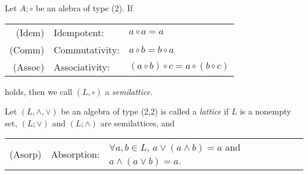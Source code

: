 \begin{definition}
    Let \(A;\circ\) be an alebra of type (2). If
    \begin{center}
        \begin{tabular}{r l l}
            (Idem) & Idempotent: & \(a \circ a = a\) \\
            (Comm) & Commutativity: & \(a \circ b = b \circ a\) \\
            (Assoc) & Associativity: & \((a\circ b) \circ c = a \circ (b \circ c)\)
        \end{tabular}
    \end{center}
    holds, then we call \((L,\circ)\) a \emph{semilattice}.
\end{definition}

\begin{definition}
    Let \((L,\wedge,\vee)\) be an algebra of type (2,2) is called a \emph{lattice} if \(L\) is a nonempty set, \((L;\vee)\) and \((L;\wedge)\) are semilattices, and
    \begin{center}
    \begin{tabular}{r l l}
        (Asorp) & Absorption: & \(\forall a,b \in L,\, a \vee (a\wedge b) = a\) and \(a\wedge (a\vee b) = a \).
    \end{tabular}
    \end{center}
\end{definition}

